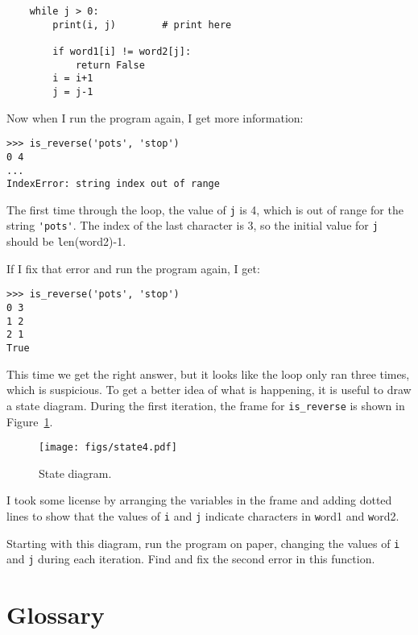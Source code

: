 \documentclass[
DIV=11,
fontsize=12,
twoside,
headinclude=false,
titlepage=firstiscover,
abstract=true,
headsepline=true,
footsepline=true,
chapterprefix=true, %
headings=big,
bibliography=totoc,%
captions=tableheading
]{scrbook}
\theoremstyle{definition}
\begin{document}
\begin{lstlisting}
    while j > 0:
        print(i, j)        # print here
        
        if word1[i] != word2[j]:
            return False
        i = i+1
        j = j-1
\end{lstlisting}
%
Now when I run the program again, I get more information:

\begin{lstlisting}
>>> is_reverse('pots', 'stop')
0 4
...
IndexError: string index out of range
\end{lstlisting}
%
The first time through the loop, the value of {\texttt j} is 4,
which is out of range for the string \verb"'pots'".
The index of the last character is 3, so the
initial value for {\texttt j} should be {\texttt len(word2)-1}.

If I fix that error and run the program again, I get:

\begin{lstlisting}
>>> is_reverse('pots', 'stop')
0 3
1 2
2 1
True
\end{lstlisting}
%
This time we get the right answer, but it looks like the loop only ran
three times, which is suspicious.  To get a better idea of what is
happening, it is useful to draw a state diagram.  During the first
iteration, the frame for \verb"is_reverse" is shown in
Figure~\ref{fig.state4}.   

\begin{figure}
\centerline
{\texttt{[image: figs/state4.pdf]}}
\caption{State diagram.}
\label{fig.state4}
\end{figure}

I took some license by arranging the variables in the frame
and adding dotted lines to show that the values of {\texttt i} and
{\texttt j} indicate characters in {\texttt word1} and {\texttt word2}.

Starting with this diagram, run the program on paper, changing the
values of {\texttt i} and {\texttt j} during each iteration.  Find and fix the
second error in this function.
\label{isreverse}


\section{Glossary}
\end{document}
